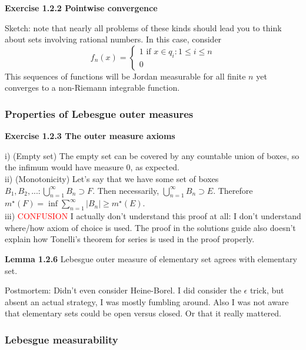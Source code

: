\documentclass[answers,12pt]{exam}
\begin{document}
\textbf{Exercise 1.2.2 Pointwise convergence}
\begin{solution}
    Sketch: note that nearly all problems of these kinds should lead you to think about sets involving rational numbers.
    In this case, consider 
    \[
    f_n(x)=
        \begin{cases}
        1 \text{ if } x \in {q_i: 1 \leq i \leq n} \\
        0
        \end{cases}
    \]
    This sequences of functions will be Jordan measurable for all finite $n$ yet converges to a non-Riemann integrable function.
\end{solution}

\subsubsection{Properties of Lebesgue outer measures}

\textbf{Exercise 1.2.3 The outer measure axioms}
\begin{solution}
    i) (Empty set) The empty set can be covered by any countable union of boxes, so the infimum would have measure 0, as expected.\\
    ii) (Monotonicity) Let's say that we have some set of boxes $B_1, B_2, ... : \bigcup_{n=1}^{\infty}B_n \supset F$.
    Then necessarily, $\bigcup_{n=1}^{\infty}B_n \supset E$.
    Therefore $m^{\star}(F) = \inf \sum_{n=1}^{\infty}|B_n| \geq m^{\star}(E)$.\\
    iii) \textcolor{red}{CONFUSION} I actually don't understand this proof at all: I don't understand where/how axiom of choice is used.
    The proof in the solutions guide also doesn't explain how Tonelli's theorem for series is used in the proof properly.
\end{solution}
\textbf{Lemma 1.2.6} Lebesgue outer measure of elementary set agrees with elementary set.
\begin{solution}
    Postmortem:
    Didn't even consider Heine-Borel.
    I did consider the $\epsilon$ trick, but absent an actual strategy, I was mostly fumbling around.
    Also I was not aware that elementary sets could be open versus closed.
    Or that it really mattered.
\end{solution}

\subsubsection{Lebesgue measurability}
\end{document}
